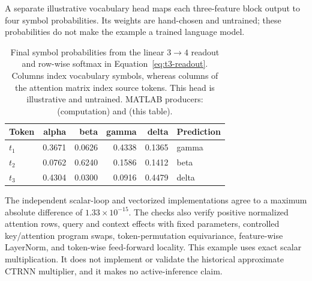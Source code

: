 A separate illustrative vocabulary head maps each three-feature block output to four symbol probabilities. Its weights are hand-chosen and untrained; these probabilities do not make the example a trained language model.

\begin{table}[htbp]\centering\small
\begin{tabular}{lrrrrl}\toprule
Token & alpha & beta & gamma & delta & Prediction \\
\midrule
$t_1$ & 0.3671 & 0.0626 & 0.4338 & 0.1365 & gamma \\
$t_2$ & 0.0762 & 0.6240 & 0.1586 & 0.1412 & beta \\
$t_3$ & 0.4304 & 0.0300 & 0.0916 & 0.4479 & delta \\
\bottomrule\end{tabular}
\caption[Illustrative four-symbol vocabulary readout]{Final symbol probabilities from the linear $3\to4$ readout and row-wise softmax in Equation~\eqref{eq:t3-readout}. Columns index vocabulary symbols, whereas columns of the attention matrix index source tokens. This head is illustrative and untrained. MATLAB producers:  (computation) and  (this table).}\label{tab:t3-readout}\end{table}

The independent scalar-loop and vectorized implementations agree to a maximum absolute difference of $1.33\times 10^{-15}$. The checks also verify positive normalized attention rows, query and context effects with fixed parameters, controlled key/attention program swaps, token-permutation equivariance, feature-wise LayerNorm, and token-wise feed-forward locality.
This example uses exact scalar multiplication. It does not implement or validate the historical approximate CTRNN multiplier, and it makes no active-inference claim.
